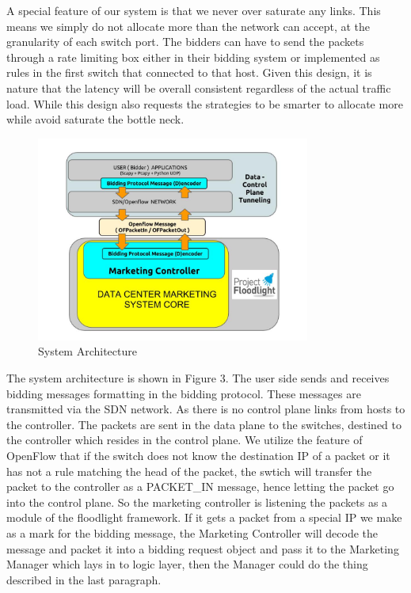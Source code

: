 \documentclass[a4paper,11pt,twocolumn]{article}
\begin{document}
A special feature of our system is that we never over saturate any links. This means we simply do not allocate more than the network can accept, at the granularity of each switch port. The bidders can have to send the packets through a rate limiting box either in their bidding system or implemented as rules in the first switch that connected to that host. Given this design, it is nature that the latency will be overall consistent regardless of the actual traffic load. While this design also requests the strategies to be smarter to allocate more while avoid saturate the bottle neck.

\begin{figure}[ht!]
\centering
\includegraphics[width=90mm]{architecture_controller.jpg}
\caption{System Architecture}
\label{overflow}
\end{figure}

The system architecture is shown in Figure 3. The user side sends and receives bidding messages formatting in the bidding protocol. These
messages are transmitted via the SDN network. As there is no control plane links from hosts to the controller. The packets are sent in the data plane to the switches, destined to the controller which resides
in the control plane. We utilize the feature of OpenFlow that if the switch does not know the destination IP of a packet or it has not a rule
matching the head of the packet, the swtich will transfer the packet to the controller as a PACKET\_IN message, hence letting the packet go into
the control plane. So the marketing controller is listening the packets as a module of the floodlight framework. If it gets a packet from a 
special IP we make as a mark for the bidding message, the Marketing Controller will decode the message and packet it into a bidding request 
object and pass it to the Marketing Manager which lays in to logic layer, then the Manager could do the thing described in the last paragraph.
\end{document}
